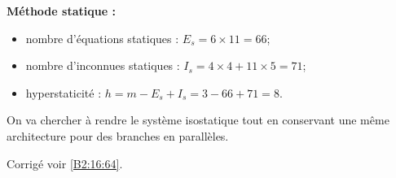 \textbf{Méthode statique : }
\begin{itemize}
\item nombre d'équations statiques : $E_s = 6\times 11 = 66$;
\item nombre d'inconnues statiques : $I_s = 4 \times 4+ 11 \times 5 = 71$;
\item hyperstaticité : $h=m-E_s + I_s = 3 -66 + 71 = 8$.
\end{itemize}


\else 
\fi

\ifprof
On va chercher à rendre le système isostatique tout en conservant une même architecture pour des branches en parallèles.
%

\else 
\fi
 
 

\ifprof
\else

\noindent\footnotesize
\normalsize

\begin{flushright}
\footnotesize{Corrigé  voir \ref{B2:16:64}.}
\end{flushright}%
\fi